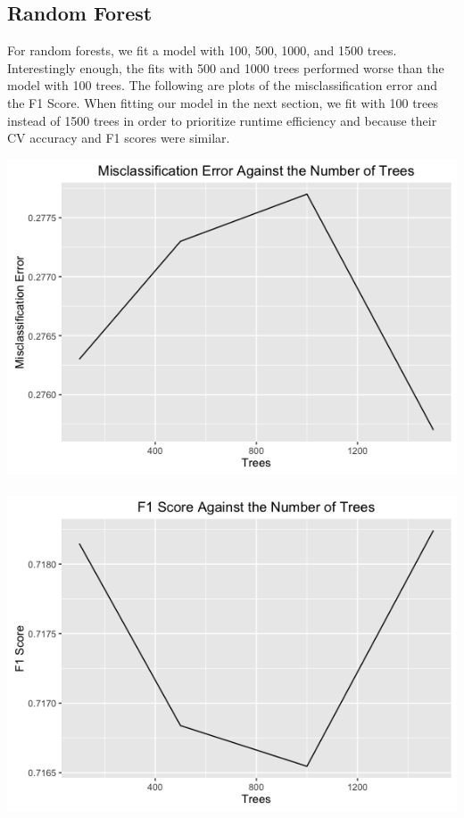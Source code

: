 \documentclass{article}
\begin{document}
\subsection{Random Forest}
For random forests, we fit a model with 100, 500, 1000, and 1500 trees. Interestingly enough, the fits with 500 and 1000 trees performed worse than the model with 100 trees. The following are plots of the misclassification error and the F1 Score. When fitting our model in the next section, we fit with 100 trees instead of 1500 trees in order to prioritize runtime efficiency and because their CV accuracy and  F1 scores were similar. \\

\centerline{\includegraphics[scale=.35]{diagrams/6rf.png} ~~~~~~~~~~ \includegraphics[scale=.35]{diagrams/7rf.png}}
\end{document}
